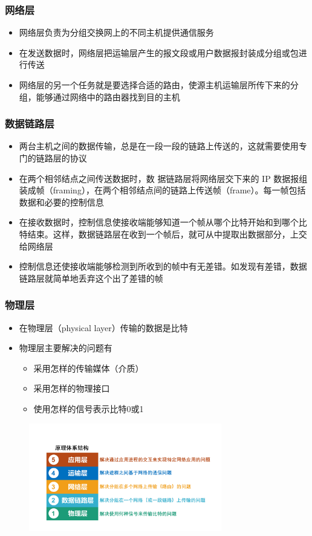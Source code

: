 \documentclass[cs4size,a4paper,10pt]{ctexart}
\begin{document}
	\subsubsection{网络层}
	\begin{itemize}
		\item 网络层负责为分组交换网上的不同主机提供通信服务
		\item 在发送数据时，网络层把运输层产生的报文段或用户数据报封装成分组或包进行传送
		\item 网络层的另一个任务就是要选择合适的路由，使源主机运输层所传下来的分组，能够通过网络中的路由器找到目的主机
	\end{itemize}

	\subsubsection{数据链路层}
	\begin{itemize}
		\item 两台主机之间的数据传输，总是在一段一段的链路上传送的，这就需要使用专门的链路层的协议
		\item 在两个相邻结点之间传送数据时，数 据链路层将网络层交下来的 IP 数据报组装成帧（framing），在两个相邻结点间的链路上传送帧（frame）。每一帧包括数据和必要的控制信息
		\item 在接收数据时，控制信息使接收端能够知道一个帧从哪个比特开始和到哪个比特结束。这样，数据链路层在收到一个帧后，就可从中提取出数据部分，上交给网络层
		\item 控制信息还使接收端能够检测到所收到的帧中有无差错。如发现有差错，数据链路层就简单地丢弃这个出了差错的帧
	\end{itemize}

	\subsubsection{物理层}
	\begin{itemize}
		\item 在物理层（physical layer）传输的数据是比特
		\item 物理层主要解决的问题有
		\begin{itemize}
			\item 采用怎样的传输媒体（介质）
			\item 采用怎样的物理接口
			\item 使用怎样的信号表示比特0或1
		\end{itemize}
	\end{itemize}
	\begin{figure}[H]
		\centering
		\includegraphics[width=0.75\textwidth]{img/1.6.2}
	\end{figure}
\end{document}
